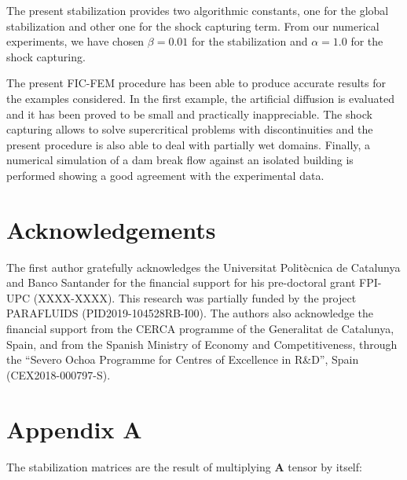 \documentclass[a4paper,12pt]{article}
\begin{document}
The present stabilization provides two algorithmic constants, one for the global stabilization and other one for the shock capturing term. From our numerical experiments, we have chosen $\beta=0.01$ for the stabilization and $\alpha=1.0$ for the shock capturing.

The present FIC-FEM procedure has been able to produce accurate results for the examples considered.
In the first example, the artificial diffusion is evaluated and it has been proved to be small and practically inappreciable. The shock capturing allows to solve supercritical problems with discontinuities and the present procedure is also able to deal with partially wet domains. Finally, a numerical simulation of a dam break flow against an isolated building is performed showing a good agreement with the experimental data.



\section{Acknowledgements}

The first author gratefully acknowledges the Universitat Politècnica de Catalunya and Banco Santander for the financial support for his pre-doctoral grant FPI-UPC (XXXX-XXXX).
This research was partially funded by the project PARAFLUIDS (PID2019-104528RB-I00). The authors also acknowledge the financial support from the CERCA programme of the Generalitat de Catalunya, Spain, and from the Spanish Ministry of Economy and Competitiveness, through the “Severo Ochoa Programme for Centres of Excellence in R\&D”, Spain (CEX2018-000797-S).



\section*{Appendix A}

The stabilization matrices are the result of multiplying $\mathbf{A}$ tensor by itself:
\end{document}
